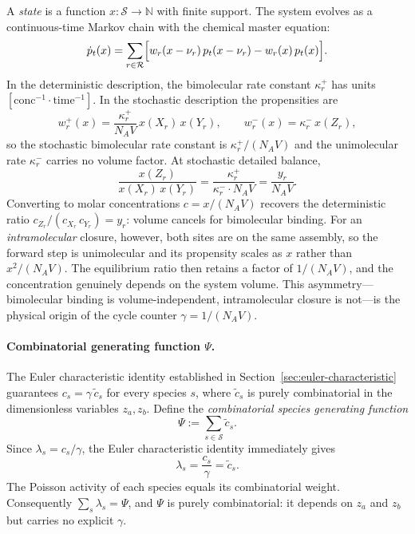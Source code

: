 \documentclass[11pt]{amsart}
\newcommand{\Species}{\mathcal{S}}
\newcommand{\Reactions}{\mathcal{R}}
\providecommand{\Nat}{\mathbb{N}}
\newcommand{\GFcomb}{\Psi}
\theoremstyle{definition}
\theoremstyle{plain}
\theoremstyle{remark}
\begin{document}
A \emph{state} is a function $x:\Species\to\Nat$ with finite support.
The system evolves as a continuous-time Markov chain with the chemical master equation:
\begin{equation}\label{eq:master_equation}
\dot{p}_t(x) = \sum_{r\in\Reactions}
\Bigl[
  w_r(x - \nu_r)\,p_t(x-\nu_r) - w_r(x)\,p_t(x)
\Bigr].
\end{equation}
In the deterministic description, the bimolecular rate constant $\kappa_r^+$ has units $[\text{conc}^{-1}\!\cdot\text{time}^{-1}]$.
In the stochastic description the propensities are
\[
w_r^+(x) = \frac{\kappa_r^+}{N_A V}\,x(X_r)\,x(Y_r),
\qquad
w_r^-(x) = \kappa_r^-\,x(Z_r),
\]
so the stochastic bimolecular rate constant is $\kappa_r^+/(N_A V)$ and the unimolecular rate $\kappa_r^-$ carries no volume factor.
At stochastic detailed balance,
\[
\frac{x(Z_r)}{x(X_r)\,x(Y_r)} = \frac{\kappa_r^+}{\kappa_r^-\cdot N_A V} = \frac{y_r}{N_A V}.
\]
Converting to molar concentrations $c = x/(N_A V)$ recovers the deterministic ratio $c_{Z_r}/(c_{X_r}\,c_{Y_r}) = y_r$: volume cancels for bimolecular binding.
For an \emph{intramolecular} closure, however, both sites are on the same assembly, so the forward step is unimolecular and its propensity scales as $x$ rather than $x^2/(N_A V)$.
The equilibrium ratio then retains a factor of $1/(N_A V)$, and the concentration genuinely depends on the system volume.
This asymmetry---bimolecular binding is volume-independent, intramolecular closure is not---is the physical origin of the cycle counter $\gamma = 1/(N_A V)$.

\paragraph{Combinatorial generating function $\GFcomb$.}
The Euler characteristic identity established in Section~\ref{sec:euler-characteristic} guarantees $c_s = \gamma\,\tilde c_s$ for every species $s$, where $\tilde c_s$ is purely combinatorial in the dimensionless variables $z_a, z_b$.
Define the \emph{combinatorial species generating function}
\begin{equation}\label{eq:psi_def}
\GFcomb := \sum_{s\in\Species} \tilde c_s.
\end{equation}
Since $\lambda_s = c_s/\gamma$, the Euler characteristic identity immediately gives
\begin{equation}\label{eq:lambda_tilde_c}
\lambda_s = \frac{c_s}{\gamma} = \tilde c_s.
\end{equation}
The Poisson activity of each species equals its combinatorial weight.
Consequently $\sum_{s}\lambda_s = \GFcomb$, and $\GFcomb$ is purely combinatorial: it depends on $z_a$ and $z_b$ but carries no explicit $\gamma$.
\end{document}
